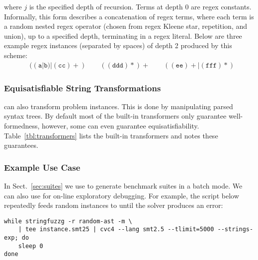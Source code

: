 where $j$ is the specified depth of recursion. Terms at depth 0 are
regex constants. Informally, this form describes a concatenation of
regex terms, where each term is a random nested regex operator (chosen from
regex Kleene star, repetition, and union), up to a specified depth,
terminating in a regex literal. Below are three example regex instances
(separated by spaces) of depth 2 produced by this scheme:
\begin{align*}
    & ((\texttt{a}|\texttt{b})|(\texttt{cc})+)\quad\quad
    ((\texttt{ddd})*)+\quad\quad ((\texttt{ee})+|(\texttt{fff})*)
\end{align*}

\subsubsection{Equisatisfiable String Transformations}
\fuzzer{} can also transform problem instances.
This is done by manipulating parsed syntax trees.
By default most of the built-in transformers 
only guarantee well-formedness, however,
some can even guarantee equisatisfiability. Table~\ref{tbl:transformers} 
lists the built-in transformers and notes these guarantees.

\subsubsection{Example Use Case}
In Sect.~\ref{sec:suites} we use \fuzzer{} to generate benchmark suites in a batch mode.
We can also use \fuzzer{} for on-line exploratory debugging. 
For example, the script below repeatedly feeds random \fuzzer{} 
instances to \cvc{} until the solver produces an error:
{\scriptsize\begin{verbatim}
while stringfuzzg -r random-ast -m \
    | tee instance.smt25 | cvc4 --lang smt2.5 --tlimit=5000 --strings-exp; do
    sleep 0
done\end{verbatim}}
